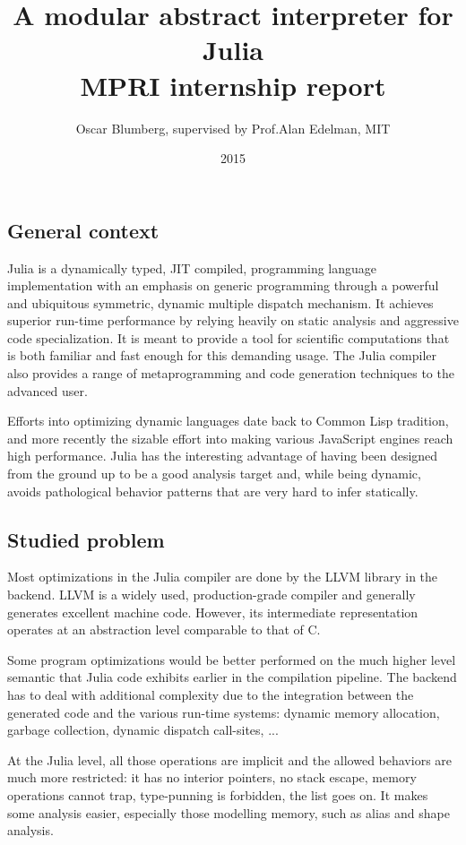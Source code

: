 \documentclass[11pt]{article}
\title{\vspace{-6ex}A modular abstract interpreter for Julia \\ MPRI internship report}
\author{Oscar Blumberg, supervised by Prof.\@ Alan Edelman, MIT}
\date{2015}
\begin{document}
\onehalfspacing
\maketitle

\thispagestyle{empty}
\vspace{1.5ex}
\subsection*{General context}

Julia\cite{julia-paper,julia-web} is a dynamically typed, JIT compiled, programming language implementation with an emphasis on generic programming through a powerful and ubiquitous symmetric, dynamic multiple dispatch mechanism. It achieves superior run-time performance by relying heavily on static analysis and aggressive code specialization. It is meant to provide a tool for scientific computations that is both familiar and fast enough for this demanding usage. The Julia compiler also provides a range of metaprogramming and code generation techniques to the advanced user.

Efforts into optimizing dynamic languages date back to Common Lisp tradition\cite{cl}, and more recently the sizable effort into making various JavaScript engines reach high performance\cite{js-trace}. Julia has the interesting advantage of having been designed from the ground up to be a good analysis target and, while being dynamic, avoids pathological behavior patterns that are very hard to infer statically.

\subsection*{Studied problem}

Most optimizations in the Julia compiler are done by the LLVM\cite{llvm} library in the backend. LLVM is a widely used, production-grade compiler and generally generates excellent machine code. However, its intermediate representation operates at an abstraction level comparable to that of C.

Some program optimizations would be better performed on the much higher level semantic that Julia code exhibits earlier in the compilation pipeline. The backend has to deal with additional complexity due to the integration between the generated code and the various run-time systems: dynamic memory allocation, garbage collection, dynamic dispatch call-sites, ...

At the Julia level, all those operations are implicit and the allowed behaviors are much more restricted: it has no interior pointers, no stack escape, memory operations cannot trap, type-punning is forbidden, the list goes on. It makes some analysis easier, especially those modelling memory, such as alias and shape analysis.
\end{document}
